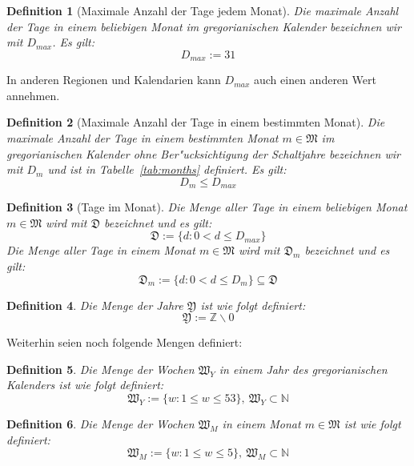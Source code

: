 \documentclass[a4paper]{article}
\newcommand*{\mondays}{\mathfrak{D}}
\newcommand*{\months}{\mathfrak{M}}
\newcommand*{\years}{\mathfrak{Y}}
\newcommand*{\weeksyr}{\mathfrak{W}_Y}
\newcommand*{\weeksmo}{\mathfrak{W}_M}
\numberwithin{equation}{section}
\newtheorem{dfn}{Definition}
\begin{document}
\begin{dfn}[Maximale Anzahl der Tage jedem Monat]
  Die maximale Anzahl der Tage in einem beliebigen Monat im gregorianischen
  Kalender bezeichnen wir mit
  $D_{max}$. Es gilt:
  \begin{equation}D_{max} := 31\end{equation}
\end{dfn}
\noindent In anderen Regionen und Kalendarien kann $D_{max}$ auch einen anderen
Wert annehmen.
\begin{dfn}[Maximale Anzahl der Tage in einem bestimmten Monat]
  Die maximale Anzahl der Tage in einem bestimmten Monat $m \in \months$ im
  gregorianischen Kalender ohne Ber"ucksichtigung der Schaltjahre bezeichnen wir
  mit $D_m$ und ist in Tabelle~\ref{tab:months} definiert. Es gilt:
  \begin{equation}D_m \le D_{max}\end{equation}
\end{dfn}
\begin{dfn}[Tage im Monat]
  Die Menge aller Tage in einem beliebigen Monat $m \in \months$ wird mit
  $\mondays$ bezeichnet und es gilt:
  \begin{equation}\mondays := \{ d : 0 < d \le D_{max}\}\end{equation}
  Die Menge aller Tage in einem Monat $m \in \months$ wird mit $\mondays_m$
  bezeichnet und es gilt:
  \begin{equation}
    \mondays_m := \{ d : 0 < d \le D_m\} \subseteq \mondays
  \end{equation}
\end{dfn}
\begin{dfn}
  Die Menge der Jahre $\years$ ist wie folgt definiert:
  \begin{equation}\years := \mathbb{Z} \backslash 0\end{equation}
\end{dfn}

\noindent Weiterhin seien noch folgende Mengen definiert:
\begin{dfn}
  Die Menge der Wochen $\weeksyr$ in einem Jahr des gregorianischen Kalenders
  ist wie folgt definiert:
  \begin{equation}
    \weeksyr := \{ w : 1 \le w \le 53 \},\ \weeksyr \subset \mathbb{N}
  \end{equation}
\end{dfn}
\begin{dfn}
  Die Menge der Wochen $\weeksmo$ in einem Monat $m \in \months$ ist wie folgt
  definiert:
  \begin{equation}
    \weeksmo := \{ w : 1 \le w \le 5 \},\ \weeksmo \subset \mathbb{N}
  \end{equation}
\end{dfn}
\end{document}
